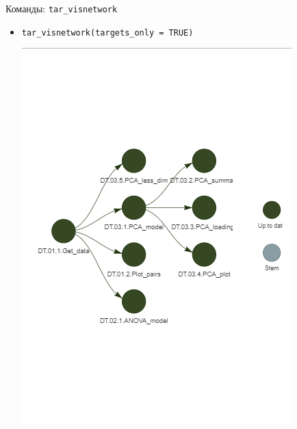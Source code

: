 \documentclass[
  ignorenonframetext,
]{beamer}
\begin{document}
\begin{frame}[fragile]{Команды: \texttt{tar\_visnetwork}}
\label{ux43aux43eux43cux430ux43dux434ux44b-tar_visnetwork}
\begin{itemize}
\item
  \texttt{tar\_visnetwork(targets\_only\ =\ TRUE)}

  \includegraphics{Sources/up_target.png}
\end{itemize}
\end{frame}
\end{document}
